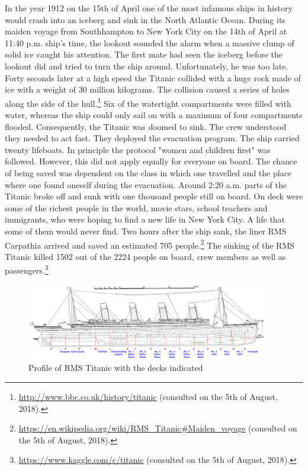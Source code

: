 \documentclass[11pt]{article}
\begin{document}
In the year 1912 on the 15th of April one of the most infamous ships in history would crash into an iceberg and sink in the North Atlantic Ocean. During its maiden voyage from Southhampton to New York City on the 14th of April at 11:40 p.m. ship's time, the lookout sounded the alarm  when a massive clump of solid ice caught his attention. The first mate had seen the iceberg before the lookout did and tried to turn the ship around. Unfortunately, he was too late. Forty seconds later at a high speed the Titanic collided with a huge rock made of ice with a weight of 30 million kilograms. The collision caused a series of holes along the side of the hull.\footnote{\url{http://www.bbc.co.uk/history/titanic} (consulted on the 5th of August, 2018).} Six of the watertight compartments were filled with water, whereas the ship could only sail on with a maximum of four compartments flooded. Consequently, the Titanic was doomed to sink. The crew understood they needed to act fast. They deployed the evacuation program. The ship carried twenty lifeboats. In principle the protocol "women and children first" was followed. However, this did not apply equally for everyone on board. The chance of being saved was  dependent on the class in which one travelled and the place where one found oneself during the evacuation. Around 2:20 a.m. parts of the Titanic broke off and sunk with one thousand people still on board. On deck were some of the richest people in the world, movie stars, school teachers and immigrants, who were hoping to find a new life in New York City. A life that some of them  would never find. Two hours after the ship sank, the liner RMS Carpathia arrived and saved an estimated 705 people.\footnote{\url{https://en.wikipedia.org/wiki/RMS\_Titanic\#Maiden\_voyage} (consulted on the 5th of August, 2018).} The sinking of the RMS Titanic killed 1502 out of the 2224 people on board, crew members as well as passengers.\footnote{\url{https://www.kaggle.com/c/titanic} (consulted on the 5th of August, 2018).}

\begin{figure}[htbp]
\centering
\includegraphics[width=400px]{./TitanicProfile.png}
\caption{\label{tab:titanicprofile}
Profile of RMS Titanic with the decks indicated}
\end{figure} 
\end{document}
